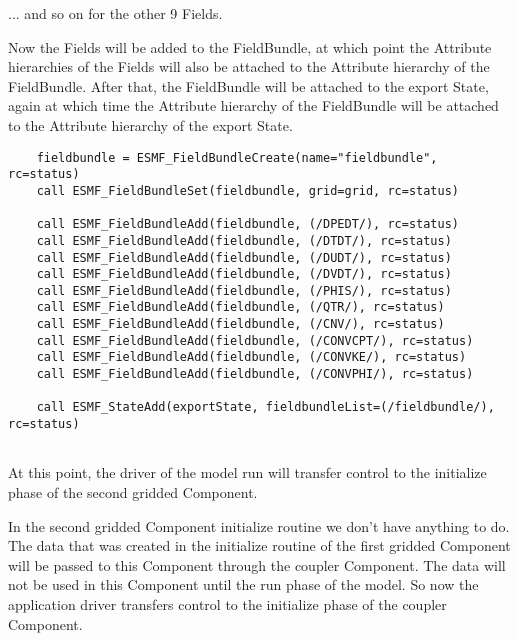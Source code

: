 
       ... and so on for the other 9 Fields.
  
   Now the Fields will be added to the FieldBundle, at which point the Attribute
   hierarchies of the Fields will also be attached to the Attribute hierarchy of
   the FieldBundle.  After that, the FieldBundle will be attached to the export
   State, again at which time the Attribute hierarchy of the FieldBundle will be
   attached to the Attribute hierarchy of the export State. 

 \begin{verbatim}
    fieldbundle = ESMF_FieldBundleCreate(name="fieldbundle", rc=status)
    call ESMF_FieldBundleSet(fieldbundle, grid=grid, rc=status)

    call ESMF_FieldBundleAdd(fieldbundle, (/DPEDT/), rc=status)
    call ESMF_FieldBundleAdd(fieldbundle, (/DTDT/), rc=status)
    call ESMF_FieldBundleAdd(fieldbundle, (/DUDT/), rc=status)
    call ESMF_FieldBundleAdd(fieldbundle, (/DVDT/), rc=status)
    call ESMF_FieldBundleAdd(fieldbundle, (/PHIS/), rc=status)
    call ESMF_FieldBundleAdd(fieldbundle, (/QTR/), rc=status)
    call ESMF_FieldBundleAdd(fieldbundle, (/CNV/), rc=status)
    call ESMF_FieldBundleAdd(fieldbundle, (/CONVCPT/), rc=status)
    call ESMF_FieldBundleAdd(fieldbundle, (/CONVKE/), rc=status)
    call ESMF_FieldBundleAdd(fieldbundle, (/CONVPHI/), rc=status)

    call ESMF_StateAdd(exportState, fieldbundleList=(/fieldbundle/), rc=status)
 
\end{verbatim}
 

   At this point, the driver of the model run will transfer control to the
   initialize phase of the second gridded Component. 

   In the second gridded Component initialize routine we don't have
   anything to do.  The data that was created in the initialize routine
   of the first gridded Component will be passed to this Component through
   the coupler Component.  The data will not be used in this Component
   until the run phase of the model.  So now the application driver transfers
   control to the initialize phase of the coupler Component. 

